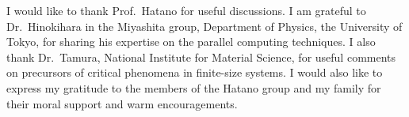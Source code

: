 
I would like to thank Prof.~Hatano for useful discussions. I am grateful to Dr.~Hinokihara in the Miyashita group, Department of Physics, the University of Tokyo, for sharing his expertise on the parallel computing techniques. I also thank Dr.~Tamura, National Institute for Material Science, for useful comments on precursors of critical phenomena in finite-size systems. I would also like to express my gratitude to the members of the Hatano group and my family for their moral support and warm encouragements.